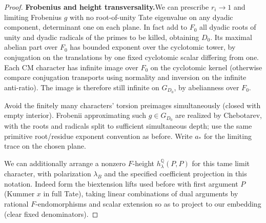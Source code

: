 \begin{proof}
\par\smallskip\noindent{}\label{cm:construction:transversality}%
\textbf{Frobenius and height transversality.}\enspace We can prescribe \(r_i\to1\) and limiting
Frobenius \(g\) with no root-of-unity Tate eigenvalue on any dyadic component, determinant one
on each plane. In fact add to \(F_0\) all dyadic roots of unity and dyadic radicals of the
primes to be killed, obtaining \(D_0\). Its maximal abelian part over \(F_0\) has bounded
exponent over the cyclotomic tower, by conjugation on the translations by one fixed cyclotomic
scalar differing from one. Each CM character has infinite image over \(F_0\) on the cyclotomic
kernel (otherwise compare conjugation transports using normality and inversion on the infinite
anti-ratio). The image is therefore still infinite on \(G_{D_0}\), by abelianness over
\(F_0\).

Avoid the finitely many characters' torsion preimages simultaneously (closed with empty
interior). Frobenii approximating such \(g\in G_{D_0}\) are realized by Chebotarev, with the
roots and radicals split to sufficient simultaneous depth; use the same primitive root/residue
exponent convention as before. Write \(a_*\) for the limiting trace on the chosen plane.

We can additionally arrange a nonzero \(F\)-height \(h_{\lambda}^{\mathbb Q}(P,P)\) for this
tame limit character, with polarization \(\lambda_B\) and the specified coefficient projection
in this notation. Indeed form the biextension lifts used before with first argument \(P\)
(Kummer \(x\) in full Tate), taking linear combinations of dual arguments by rational
\(F\)-endomorphisms and scalar extension so as to project to our embedding (clear fixed
denominators).


\end{proof}
